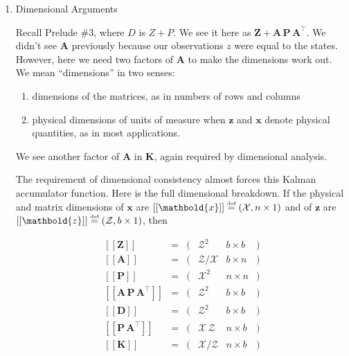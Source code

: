 \documentclass[10pt,oneside,x11names]{article}
\begin{document}
\begin{enumerate}
\item Dimensional Arguments
\label{sec:orgheadline13}

\noindent Recall Prelude \#3, where \(D\) is \(Z+P\). We see it here as
\(\mathbold{Z}+\mathbold{A}\,\mathbold{P}\,\mathbold{A}^\intercal\). We didn't see
\(\mathbold{A}\) previously because our observations \(z\) were equal to the
states. However, here we need two factors of
\(\mathbold{A}\) to make the dimensions work out. We mean ``dimensions'' in two
senses:

\begin{enumerate}
\item dimensions of the matrices, as in numbers of rows and columns
\item physical dimensions of units of measure when \(\mathbold{z}\) and
\(\mathbold{x}\) denote physical quantities, as in most applications.
\end{enumerate}

We see another factor of
\(\mathbold{A}\) in  \(\mathbold{K}\), again required by
dimensional analysis. 

The requirement of dimensional consistency almost forces this Kalman
accumulator function. 
Here is the full dimensional breakdown. If the physical and matrix dimensions of 
\(\mathbold{x}\) 
are
\(\left[\left[\mathbold{x}\right]\right]
\stackrel{\text{\tiny def}}{=}
(\mathcal{X}, n\times{1})\)
and of 
\(\mathbold{z}\) 
are
\(\left[\left[\mathbold{z}\right]\right]
\stackrel{\text{\tiny def}}{=}
(\mathcal{Z}, b\times{1})\), then

\begin{equation*}
\label{eqn:dimensional-breakdown}
\begin{array}{lccccr}
\left[\left[\mathbold{Z}\right]\right]                                       &=& (&\mathcal{Z}^2            & b\times{b}&) \\
\left[\left[\mathbold{A}\right]\right]                                       &=& (&\mathcal{Z}/\mathcal{X}  & b\times{n}&) \\
\left[\left[\mathbold{P}\right]\right]                                       &=& (&\mathcal{X}^2            & n\times{n}&) \\
\left[\left[\mathbold{A}\,\mathbold{P}\,\mathbold{A}^\intercal\right]\right] &=& (&\mathcal{Z}^2            & b\times{b}&) \\
\left[\left[\mathbold{D}\right]\right]                                       &=& (&\mathcal{Z}^2            & b\times{b}&) \\
\left[\left[\mathbold{P}\,\mathbold{A}^\intercal\right]\right]               &=& (&\mathcal{X}\,\mathcal{Z} & n\times{b}&) \\
\left[\left[\mathbold{K}\right]\right]                                       &=& (&\mathcal{X}/\mathcal{Z}  & n\times{b}&)
\end{array}
\end{equation*}


\end{enumerate}
\end{document}
